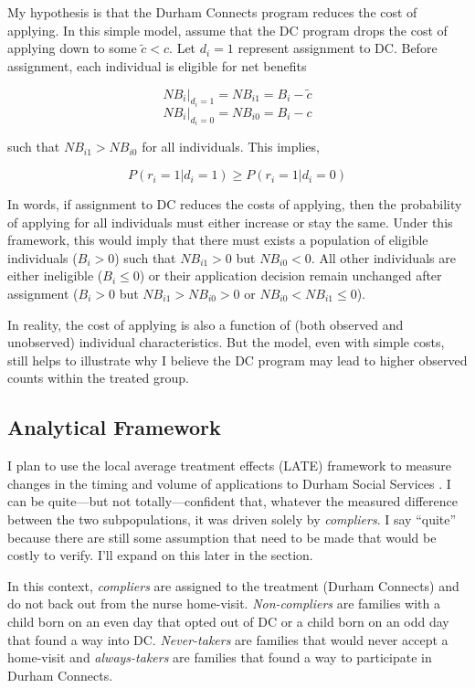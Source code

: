 \documentclass[12pt,letterpaperpaper,]{book}
\begin{document}
My hypothesis is that the Durham Connects program reduces the cost of
applying. In this simple model, assume that the DC program drops the
cost of applying down to some \(\tilde c < c\). Let \(d_i = 1\)
represent assignment to DC. Before assignment, each individual is
eligible for net benefits

\[NB_i|_{d_i=1} = NB_{i1} = B_i - \tilde c\]
\[NB_i|_{d_i=0} = NB_{i0} = B_i - c\]

such that \(NB_{i1} > NB_{i0}\) for all individuals. This implies,

\[P(r_i = 1|d_i = 1) \ge P(r_i=1|d_i = 0)\]

In words, if assignment to DC reduces the costs of applying, then the
probability of applying for all individuals must either increase or stay
the same. Under this framework, this would imply that there must exists
a population of eligible individuals (\(B_i > 0\)) such that
\(NB_{i1} > 0\) but \(NB_{i0} < 0\). All other individuals are either
ineligible (\(B_i \le 0\)) or their application decision remain
unchanged after assignment (\(B_i > 0\) but \(NB_{i1} > NB_{i0} > 0\) or
\(NB_{i0} < NB_{i1} \le 0\)).

In reality, the cost of applying is also a function of (both observed
and unobserved) individual characteristics. But the model, even with
simple costs, still helps to illustrate why I believe the DC program may
lead to higher observed counts within the treated group.

\subsection*{Analytical Framework}\label{analytical-framework}

I plan to use the local average treatment effects (LATE) framework to
measure changes in the timing and volume of applications to Durham
Social Services \citep{angrist_mostly_2008}. I can be quite---but not
totally---confident that, whatever the measured difference between the
two subpopulations, it was driven solely by \emph{compliers}. I say
``quite'' because there are still some assumption that need to be made
that would be costly to verify. I'll expand on this later in the
section.

In this context, \emph{compliers} are assigned to the treatment (Durham
Connects) and do not back out from the nurse home-visit.
\emph{Non-compliers} are families with a child born on an even day that
opted out of DC or a child born on an odd day that found a way into DC.
\emph{Never-takers} are families that would never accept a home-visit
and \emph{always-takers} are families that found a way to participate in
Durham Connects.
\end{document}
